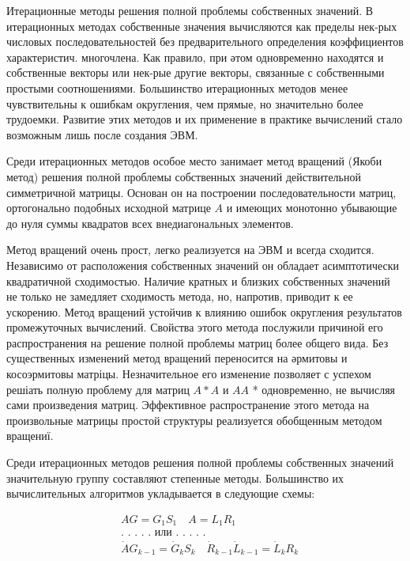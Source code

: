 \documentclass[10pt]{article}
\begin{document}
Итерационные методы решения полной проблемы собственных значений. В итерационных методах собственные значения вычисляются как пределы нек-рых числовых последовательностей без предварительного определения коэффициентов характеристич. многочлена. Как правило, при әтом одновременно находятся и собственные векторы или нек-рые другие векторы, связанные с собственными простыми соотношениями. Большинство итерационных методов менее чувствительны к ошибкам округления, чем прямые, но значительно более трудоемки. Развитие этих методов и их применение в практике вычислений стало возможным лишь после создания ЭВМ.



Среди итерационных методов особое место занимает метод вращений (Якоби метод) решения полной проблемы собственных значений действительной симметричной матрицы. Основан он на построении последовательности матриц, ортогонально подобных исходной матрице $A$ и имеющих монотонно убывающие до нуля суммы квадратов всех внедиагональных элементов.



Метод вращений очень прост, легко реализуется на ЭВМ и всегда сходится. Независимо от расположения собственных значений он обладает асимптотически квадратичной сходимостью. Наличие кратных и близких собственных значений не только не замедляет сходимость метода, но, напротив, приводит к ее ускорению. Метод вращений устойчив к влиянию ошибок округления результатов промежуточных вычислений. Свойства этого метода послужили причиной его распространения на решение полной проблемы матриц более общего вида. Без существенных изменений метод вращений переносится на әрмитовы и косоэрмитовы матріцы. Незначительное его изменение позволяет с успехом решіать полную проблему для матриц $A * A$ и $A A$ * одновременно, не вычисляя сами произведения матриц. Эффективное распространение этого метода на произвольные матрицы простой структуры реализуется обобщенным методом вращениї.



Среди итерационных методов решения полной проблемы собственных значений значительную группу составляют степенные методы. Большинство их вычислительных алгоритмов укладывается в следующие схемы:



\[

\begin{aligned}

& A G=G_{1} S_{1} \quad A=L_{1} R_{1} \\

& \text {. . . . . или . . . . . } \\

& \dot{A} G_{k-1}=\dot{G}_{k} S_{k} \quad \dot{R}_{k-1} \dot{L}_{k-1}=\dot{L}_{k} R_{k}

\end{aligned}

\]
\end{document}
